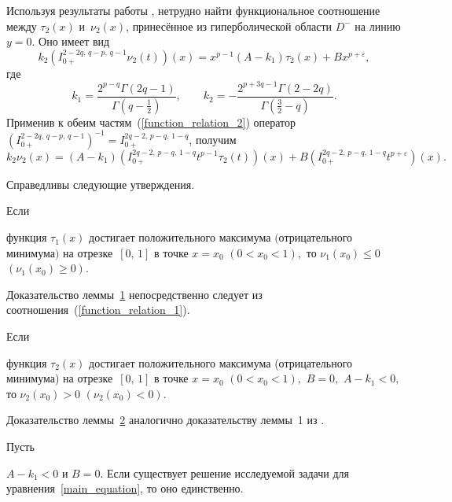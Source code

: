 Используя результаты работы \cite{sayg:RSH}, нетрудно найти функциональное соотношение между $\tau_2(x)$ и~$\nu_2(x)$, принесённое из гиперболической области $D^-$ на линию $y=0$. Оно имеет вид
\begin{equation}\label{function_relation_2}
 k_2\left(I_{0+}^{2-2q,\,q-p,\,q-1}\nu_2(t)\right)(x)=x^{p-1}(A-k_1)\tau_2(x)+Bx^{p+\varepsilon},
\end{equation}
где
$$
    k_1=\dfrac{2^{p-q}\Gamma(2q-1)}{\Gamma(q-\frac{1}{2})},\qquad k_2=-\dfrac{2^{p+3q-1}\Gamma(2-2q)}{\Gamma(\frac{3}{2}-q)}.
$$
Применив к обеим частям~(\ref{function_relation_2}) оператор
$\left(I_{0+}^{2-2q,\,q-p,\,q-1}\right)^{-1}=I_{0+}^{2q-2,\,p-q,\,1-q}$, получим
$$%
 k_2\nu_2(x)=(A-k_1)\left(I_{0+}^{2q-2,\,p-q,\,1-q}t^{p-1}\tau_2(t)\right)(x)
             +B\left(I_{0+}^{2q-2,\,p-q,\,1-q}t^{p+\varepsilon}\right)(x).
$$%

Справедливы следующие утверждения.

\smallskip

\begin{lemma}[1]\hypertarget{say:lem1}{Если}  функция $\tau_1(x)$ достигает положительного максимума $($отрицательного минимума$)$ на отрезке~$[0,\,1]$ в точке $x=x_0$ $(0<x_0<1),$ то
$\nu_1(x_0)\leqslant0$ $(\nu_1(x_0)\geqslant0).$ 
\end{lemma}

Доказательство леммы~\hyperlink{say:lem1}{1} непосредственно следует из соотношения~(\ref{function_relation_1}).

\smallskip

\begin{lemma}[2]\hypertarget{say:lem2}{Если} функция $\tau_2(x)$ достигает положительного максимума
(отрицательного минимума) на отрезке~$[0,\,1]$ в точке $x=x_0$ $(0<x_0<1),$
$B=0,$ $A-k_1<0,$ то $\nu_2(x_0)>0$ $(\nu_2(x_0)<0).$
\end{lemma}

Доказательство леммы~\hyperlink{say:lem2}{2} аналогично доказательству леммы~1 из \cite{sayg:KR1}.

\smallskip

\begin{theorem}[1]\hypertarget{say:th1}{Пусть} $A-k_1<0$ и $B=0$. 
Если существует решение исследуемой задачи для уравнения~\eqref{main_equation}{\rm,} то оно единственно{\rm.}
\end{theorem}

